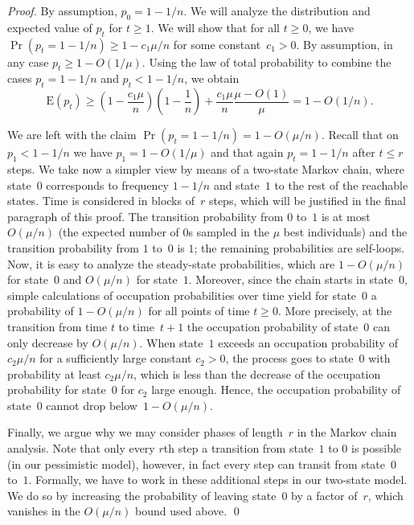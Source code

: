 \documentclass[11pt, a4paper]{article}
\DeclareMathOperator{\Prob}{Pr}
\newcommand*{\E}{\mathrm{E}}
\begin{document}
\begin{proof}
By assumption, $p_0=1-1/n$. We will analyze the 
distribution and expected value 
of $p_{t}$ for $t\ge 1$. %
We will show that for all $t\ge 0$, we have $\Prob(p_t=1-1/n) \ge 1-c_1\mu/n$ for 
some constant~$c_1>0$. By assumption, in any case $p_t\ge 1-O(1/\mu)$. Using the 
law of total probability to combine the cases $p_t=1-1/n$ and $p_t<1-1/n$, 
we obtain 
\[
\E(p_t)\ge \left(1-\frac{c_1\mu}{n}\right)\left(1-\frac{1}{n}\right) + \frac{c_1\mu}{n} \frac{\mu-O(1)}{\mu} = 1-O(1/n).
\]


We are left with the claim $\Prob(p_t=1-1/n)=1-O(\mu/n)$. Recall that 
on $p_{1}<1-1/n$ we have $p_{1}=1-O(1/\mu)$ and that again $p_t=1-1/n$ after $t\le r$ steps. 
We take now a simpler view by means of a two-state Markov chain, where state~$0$ 
corresponds to frequency $1-1/n$ and state~$1$ to the rest of the reachable states. Time is 
considered in blocks of~$r$ steps, which will be justified in the final paragraph of this proof. 
The transition probability from $0$ to~$1$ is at most $O(\mu/n)$ (the expected number of $0$s sampled 
in the $\mu$ best individuals)  
and the transition probability from $1$ to~$0$ is $1$; the remaining probabilities are self-loops. Now, it 
is easy to analyze the steady-state probabilities, which are $1-O(\mu/n)$ for state~$0$ and 
$O(\mu/n)$ for state~$1$. Moreover, since the chain starts in state~$0$, simple 
calculations of occupation probabilities over time yield for state~$0$ 
a probability of  
$1-O(\mu/n)$ for all points of time $t\ge 0$. More precisely, at the transition 
from time $t$ to time~$t+1$ the occupation probability of state~$0$ can only decrease by $O(\mu/n)$. 
When  state~$1$ exceeds an occupation probability of $c_2\mu /n$ for a sufficiently large constant 
$c_2>0$, the process goes to state~$0$ with probability at least $c_2\mu/n$, which is 
less than the decrease of the occupation probability for state~$0$ for $c_2$ large enough. Hence, 
the occupation probability of state~$0$ cannot drop below~$1-O(\mu/n)$. 

Finally, we argue why we may consider phases of length~$r$ in the Markov chain analysis. Note that 
only every $r$th step a transition from state~$1$ to $0$ is possible (in our pessimistic model), however, 
in fact every step can transit from state~$0$ to~$1$. Formally, we have 
to work in these additional steps in our two-state model. 
We do so by increasing the probability 
of leaving state~$0$ by a factor of~$r$, which vanishes in the $O(\mu/n)$ bound used above.
\qed\end{proof}
\end{document}
